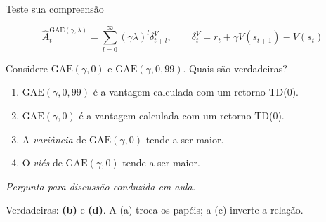 \documentclass[aspectratio=169, 10pt]{beamer}
\newcommand{\paradiscussao}{\smallskip
  {\footnotesize\color{rlCinza}\itshape Pergunta para discussão conduzida em aula.}}
\newcommand{\Ahat}{\hat{A}}
\begin{document}
\begin{frame}{Teste sua compreensão}

  \[
    \Ahat^{\mathrm{GAE}(\gamma,\lambda)}_t = \sum_{l=0}^{\infty}(\gamma\lambda)^{l}\delta^V_{t+l},
    \qquad \delta^V_t = r_t + \gamma V(s_{t+1}) - V(s_t)
  \]

  \vspace{-0.9em}
  \begin{quizbox}{}
    Considere $\mathrm{GAE}(\gamma,0)$ e $\mathrm{GAE}(\gamma,0{,}99)$. Quais são verdadeiras?
    \begin{enumerate}\setlength{\itemsep}{0.1ex}\small
      \item[(a)] $\mathrm{GAE}(\gamma,0{,}99)$ é a vantagem calculada com um retorno TD(0).
      \item[(b)] $\mathrm{GAE}(\gamma,0)$ é a vantagem calculada com um retorno TD(0).
      \item[(c)] A \emph{variância} de $\mathrm{GAE}(\gamma,0)$ tende a ser maior.
      \item[(d)] O \emph{viés} de $\mathrm{GAE}(\gamma,0)$ tende a ser maior.
    \end{enumerate}
    \paradiscussao
  \end{quizbox}

  \pause
  \begin{respbox}
    Verdadeiras: \textbf{(b)} e \textbf{(d)}. A (a) troca os papéis; a (c) inverte a relação.
  \end{respbox}
\end{frame}
\end{document}
